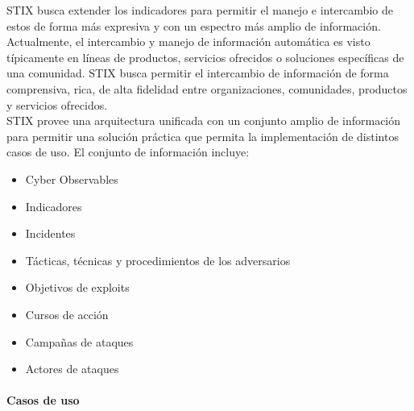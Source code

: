 STIX busca extender los indicadores para permitir el manejo e intercambio de 
estos de forma más expresiva y con un espectro más amplio de información.\\

Actualmente, el intercambio y manejo de información automática es visto 
típicamente en líneas de productos, servicios ofrecidos o soluciones específicas 
de una comunidad. STIX busca permitir el intercambio de información de forma 
comprensiva, rica, de alta fidelidad entre organizaciones, comunidades, 
productos y servicios ofrecidos.\\

STIX provee una arquitectura unificada con un conjunto amplio de información 
para permitir una solución práctica que permita la implementación de distintos 
casos de uso. El conjunto de información incluye:
\begin{itemize}
  \item Cyber Observables
  \item Indicadores
  \item Incidentes
  \item Tácticas, técnicas y procedimientos de los adversarios
  \item Objetivos de exploits
  \item Cursos de acción
  \item Campañas de ataques
  \item Actores de ataques
\end{itemize}


\paragraph{Casos de uso}\ \\


